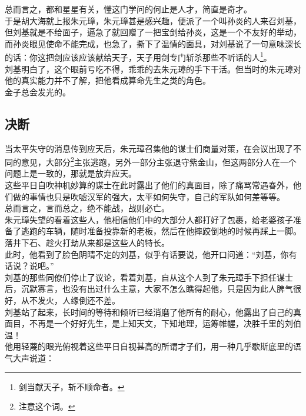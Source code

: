 \begin{multicols}{\theparacolNo}
总而言之，都和星星有关，懂这门学问的何止是人才，简直是奇才。\\

于是胡大海就上报朱元璋，朱元璋甚是感兴趣，便派了一个叫孙炎的人来召刘基，但刘基就是不给面子，逼急了就回赠了一把宝剑给孙炎，这是一个不友好的举动，而孙炎眼见使命不能完成，也急了，撕下了温情的面具，对刘基说了一句意味深长的话：你这把剑应该应该献给天子，天子用剑专门斩杀那些不听话的人\footnote{剑当献天子，斩不顺命者。}。\\

刘基明白了，这个眼前亏吃不得，乖乖的去朱元璋的手下干活。但当时的朱元璋对他的真实能力并不了解，把他看成算命先生之类的角色。\\

金子总会发光的。\\

\subsection{决断}
当太平失守的消息传到应天后，朱元璋召集他的谋士们商量对策，在会议出现了不同的意见，大部分\footnote{注意这个词。}主张逃跑，另外一部分主张退守紫金山，但这两部分人在一个问题上是一致的，那就是放弃应天。\\

这些平日自吹神机妙算的谋士在此时露出了他们的真面目，除了痛骂常遇春外，他们做的事情也只是吹嘘汉军的强大，太平如何失守，自己的军队如何差等等。\\

总而言之，言而总之，绝不能战，战则必亡。\\

朱元璋失望的看着这些人，他相信他们中的大部分人都打好了包裹，给老婆孩子准备了逃跑的车辆，随时准备投靠新的老板，然后在他摔跤倒地的时候再踩上一脚。落井下石、趁火打劫从来都是这些人的特长。\\

此时，他看到了脸色阴晴不定的刘基，似乎有话要说，他开口问道：“刘基，你有话说？说吧。”\\

刘基的那些同僚们停止了议论，看着刘基，自从这个人到了朱元璋手下担任谋士后，沉默寡言，也没有出过什么主意，大家不怎么瞧得起他，只是因为此人脾气很好，从不发火，人缘倒还不差。\\

刘基站了起来，长时间的等待和倾听已经消磨了他所有的耐心，他露出了自己的真面目，不再是一个好好先生，是上知天文，下知地理，运筹帷幄，决胜千里的刘伯温！\\

他用轻蔑的眼光俯视着这些平日自视甚高的所谓才子们，用一种几乎歇斯底里的语气大声说道：\\


\end{multicols}
